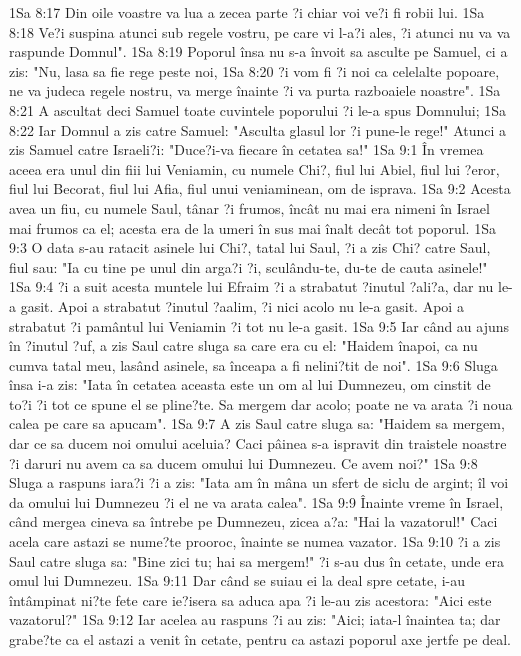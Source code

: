 1Sa 8:17  Din oile voastre va lua a zecea parte ?i chiar voi ve?i fi robii lui.
1Sa 8:18  Ve?i suspina atunci sub regele vostru, pe care vi l-a?i ales, ?i atunci nu va va raspunde Domnul".
1Sa 8:19  Poporul însa nu s-a învoit sa asculte pe Samuel, ci a zis: "Nu, lasa sa fie rege peste noi,
1Sa 8:20  ?i vom fi ?i noi ca celelalte popoare, ne va judeca regele nostru, va merge înainte ?i va purta razboaiele noastre".
1Sa 8:21  A ascultat deci Samuel toate cuvintele poporului ?i le-a spus Domnului;
1Sa 8:22  Iar Domnul a zis catre Samuel: "Asculta glasul lor ?i pune-le rege!" Atunci a zis Samuel catre Israeli?i: "Duce?i-va fiecare în cetatea sa!"
1Sa 9:1  În vremea aceea era unul din fiii lui Veniamin, cu numele Chi?, fiul lui Abiel, fiul lui ?eror, fiul lui Becorat, fiul lui Afia, fiul unui veniaminean, om de isprava.
1Sa 9:2  Acesta avea un fiu, cu numele Saul, tânar ?i frumos, încât nu mai era nimeni în Israel mai frumos ca el; acesta era de la umeri în sus mai înalt decât tot poporul.
1Sa 9:3  O data s-au ratacit asinele lui Chi?, tatal lui Saul, ?i a zis Chi? catre Saul, fiul sau: "Ia cu tine pe unul din arga?i ?i, sculându-te, du-te de cauta asinele!"
1Sa 9:4  ?i a suit acesta muntele lui Efraim ?i a strabatut ?inutul ?ali?a, dar nu le-a gasit. Apoi a strabatut ?inutul ?aalim, ?i nici acolo nu le-a gasit. Apoi a strabatut ?i pamântul lui Veniamin ?i tot nu le-a gasit.
1Sa 9:5  Iar când au ajuns în ?inutul ?uf, a zis Saul catre sluga sa care era cu el: "Haidem înapoi, ca nu cumva tatal meu, lasând asinele, sa înceapa a fi nelini?tit de noi".
1Sa 9:6  Sluga însa i-a zis: "Iata în cetatea aceasta este un om al lui Dumnezeu, om cinstit de to?i ?i tot ce spune el se pline?te. Sa mergem dar acolo; poate ne va arata ?i noua calea pe care sa apucam".
1Sa 9:7  A zis Saul catre sluga sa: "Haidem sa mergem, dar ce sa ducem noi omului aceluia? Caci pâinea s-a ispravit din traistele noastre ?i daruri nu avem ca sa ducem omului lui Dumnezeu. Ce avem noi?"
1Sa 9:8  Sluga a raspuns iara?i ?i a zis: "Iata am în mâna un sfert de siclu de argint; îl voi da omului lui Dumnezeu ?i el ne va arata calea".
1Sa 9:9  Înainte vreme în Israel, când mergea cineva sa întrebe pe Dumnezeu, zicea a?a: "Hai la vazatorul!" Caci acela care astazi se nume?te prooroc, înainte se numea vazator.
1Sa 9:10  ?i a zis Saul catre sluga sa: "Bine zici tu; hai sa mergem!" ?i s-au dus în cetate, unde era omul lui Dumnezeu.
1Sa 9:11  Dar când se suiau ei la deal spre cetate, i-au întâmpinat ni?te fete care ie?isera sa aduca apa ?i le-au zis acestora: "Aici este vazatorul?"
1Sa 9:12  Iar acelea au raspuns ?i au zis: "Aici; iata-l înaintea ta; dar grabe?te ca el astazi a venit în cetate, pentru ca astazi poporul axe jertfe pe deal.

